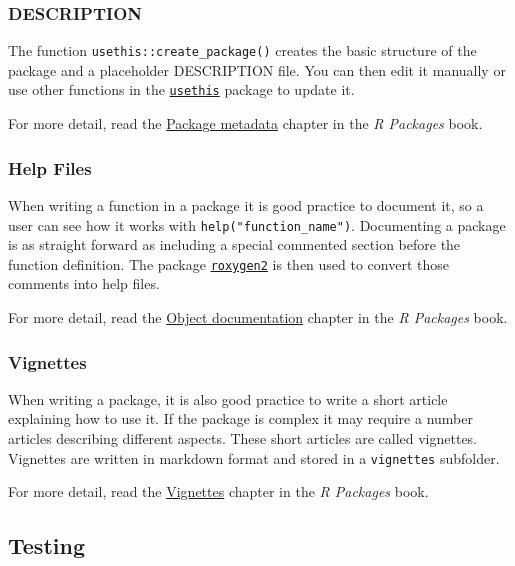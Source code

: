 \documentclass[]{book}
\begin{document}
\hypertarget{description}{%
\subsubsection{DESCRIPTION}\label{description}}

The function \texttt{usethis::create\_package()} creates the basic structure of the package and a
placeholder DESCRIPTION file. You can then edit it manually or use other functions in the
\href{https://usethis.r-lib.org}{\texttt{usethis}} package to update it.

For more detail, read the \href{http://r-pkgs.had.co.nz/description.html}{Package metadata} chapter in
the \emph{R Packages} book.

\hypertarget{help-files}{%
\subsubsection{Help Files}\label{help-files}}

When writing a function in a package it is good practice to document it, so a user can see how it
works with \texttt{help("function\_name")}. Documenting a package is as straight forward as including a
special commented section before the function definition. The package
\href{https://www.rdocumentation.org/packages/roxygen2}{\texttt{roxygen2}} is then used to convert those
comments into help files.

For more detail, read the \href{http://r-pkgs.had.co.nz/man.html}{Object documentation} chapter in
the \emph{R Packages} book.

\hypertarget{vignettes}{%
\subsubsection{Vignettes}\label{vignettes}}

When writing a package, it is also good practice to write a short article explaining how to use
it. If the package is complex it may require a number articles describing different aspects. These
short articles are called vignettes. Vignettes are written in markdown format and stored in a
\texttt{vignettes} subfolder.

For more detail, read the \href{http://r-pkgs.had.co.nz/vignettes.html}{Vignettes} chapter in
the \emph{R Packages} book.

\hypertarget{testing-1}{%
\subsection{Testing}\label{testing-1}}
\end{document}
